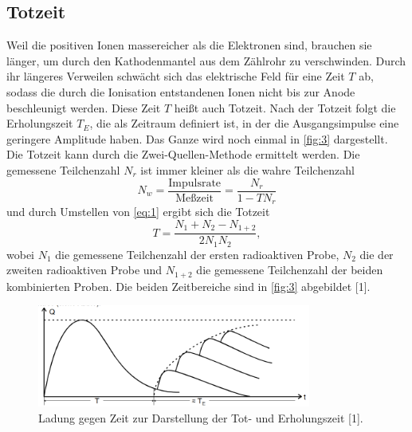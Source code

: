 \subsection{Totzeit}
Weil die positiven Ionen massereicher als die Elektronen sind, brauchen sie länger, um durch den Kathodenmantel aus dem Zählrohr zu verschwinden. Durch ihr längeres Verweilen schwächt sich das elektrische Feld für eine Zeit $T$ ab, sodass die durch die Ionisation entstandenen Ionen nicht bis zur Anode beschleunigt werden. Diese Zeit $T$ heißt auch Totzeit. Nach der Totzeit folgt die Erholungszeit $T_E$, die als Zeitraum definiert ist, in der die Ausgangsimpulse eine geringere Amplitude haben. Das Ganze wird noch einmal in \autoref{fig:3} dargestellt.\\
Die Totzeit kann durch die Zwei-Quellen-Methode ermittelt werden. Die gemessene Teilchenzahl $N_r$ ist immer kleiner als die wahre Teilchenzahl
\begin{equation}
  N_w=\frac{\textrm{Impulsrate}}{\textrm{Meßzeit}}=\frac{N_r}{1-TN_r}
  \label{eq:1}
\end{equation}
und durch Umstellen von \eqref{eq:1} ergibt sich die Totzeit
\begin{equation}
  T=\frac{N_1+N_2-N_{1+2}}{2N_{1}N_{2}},
  \label{eq:2}
\end{equation}
wobei $N_1$ die gemessene Teilchenzahl der ersten radioaktiven Probe, $N_2$ die der zweiten radioaktiven Probe und $N_{1+2}$ die gemessene Teilchenzahl der beiden kombinierten Proben.
Die beiden Zeitbereiche sind in \autoref{fig:3} abgebildet [1].
\begin{figure}[H] 
  \centering 
  \includegraphics[width=9cm]{content/3.png} 
  \caption{Ladung gegen Zeit zur Darstellung der Tot- und Erholungszeit [1].} 
  \label{fig:3} 
\end{figure}



